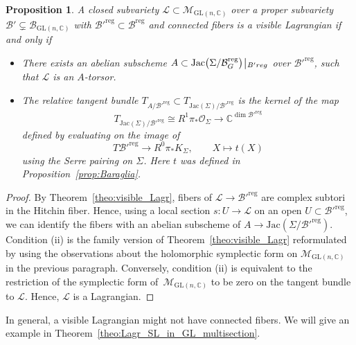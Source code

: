 \documentclass[pdftex]{sigma}
\numberwithin{equation}{section}
\newtheorem{prop}[theo]{Proposition}
\theoremstyle{definition}
\newcommand{\reg}{\mathrm{reg}}
\newcommand{\Jac}{\mathrm{Jac}}
\newcommand{\rest}{\: \rule[-3.5pt]{0.5pt}{11.5pt}\,{}}
\renewcommand{\to}{\rightarrow}
\newcommand{\calB}{\mathcal{B}}
\newcommand{\calL}{\mathcal{L}}
\newcommand{\calM}{\mathcal{M}}
\newcommand{\calO}{\mathcal{O}}
\newcommand{\CC}{\mathbb{C}}
\newcommand{\GL}{\mathrm{GL}}
\begin{document}
\begin{prop}\label{prop:criterion} A closed subvariety $\calL \subset \calM_{\GL(n,\CC)}$ over a proper subvariety $\calB' \subsetneq \calB_{\GL(n,\CC)}$ with $\calB'^\reg \subset \calB^\reg$ and connected fibers is a visible Lagrangian if and only if
 \begin{itemize}\itemsep=0pt
 \item[$(i)$] There exists an abelian subscheme $A \subset \Jac\bigl(\Sigma/\calB_G^\reg\bigr) \rest_{B'^\reg}$ over $\calB'^\reg$, such that $\calL$ is an $A$-torsor.
 \item[$(ii)$] The relative tangent bundle $T_{A/\calB'^\reg} \subset T_{\Jac(\Sigma)/\calB'^\reg}$ is the kernel of the map
 \[ T_{\Jac(\Sigma)/\calB'^\reg} \cong R^1\pi_*\calO_\Sigma \to \CC^{\dim \calB'^\reg}
 \]
 defined by evaluating on the image of
 \[ T\calB'^\reg \to R^0\pi_*K_\Sigma, \qquad X \mapsto t(X)
 \]
 using the Serre pairing on $\Sigma$. Here $t$ was defined in Proposition~{\rm \ref{prop:Baraglia}}.
 \end{itemize}
\end{prop}

\begin{proof} By Theorem~\ref{theo:visible_Lagr}, fibers of $\calL \to \calB'^\reg$ are complex subtori in the Hitchin fiber. Hence, using a local section $s\colon U \to \calL$ on an open $U \subset \calB'^\reg$, we can identify the fibers with an abelian subscheme of $A \to \Jac(\Sigma/\calB'^\reg)$. Condition (ii) is the family version of Theorem~\ref{theo:visible_Lagr} reformulated by using the observations about the holomorphic symplectic form on $\calM_{\GL(n,\CC)}$ in the previous paragraph. Conversely, condition (ii) is equivalent to the restriction of the symplectic form of~$\calM_{\GL(n,\CC)}$ to be zero on the tangent bundle to $\calL$. Hence, $\calL$ is a Lagrangian.
\end{proof}

In general, a visible Lagrangian might not have connected fibers. We will give an example in Theorem~\ref{theo:Lagr_SL_in_GL_multisection}.
\end{document}
